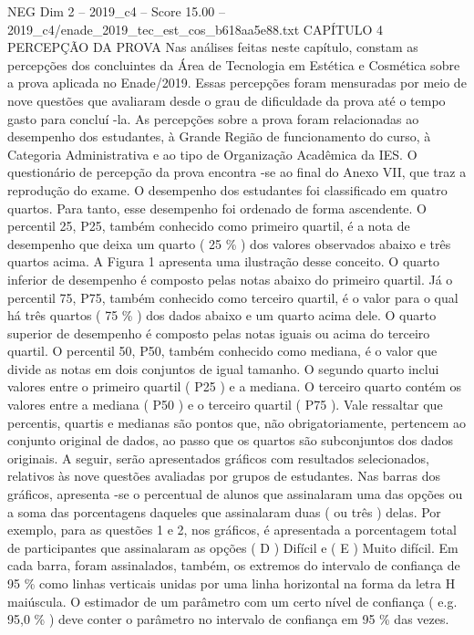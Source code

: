 \begin{textsample}{NEG Dim 2 – 2019\_c4 – Score 15.00 – 2019\_c4/enade\_2019\_tec\_est\_cos\_b618aa5e88.txt}  \label{ex:f2_neg_391}
CAPÍTULO 4 PERCEPÇÃO DA PROVA Nas análises feitas neste capítulo, constam as percepções dos concluintes da Área de Tecnologia em Estética e Cosmética sobre a prova aplicada no Enade/2019.
Essas percepções foram mensuradas por meio de nove questões que avaliaram desde o grau de dificuldade da prova até o tempo gasto para concluí -la.
As percepções sobre a prova foram relacionadas ao desempenho dos estudantes, à Grande Região de funcionamento do curso, à Categoria Administrativa e ao tipo de Organização Acadêmica da IES.
O questionário de percepção da prova encontra -se ao final do Anexo VII, que traz a reprodução do exame.
O desempenho dos estudantes foi classificado em quatro quartos.
Para tanto, esse desempenho foi ordenado de forma ascendente.
O percentil 25, P25, também conhecido como primeiro quartil, é a nota de desempenho que deixa um quarto ( 25 \% ) dos valores observados abaixo e três quartos acima.
A Figura 1 apresenta uma ilustração desse conceito.
O quarto inferior de desempenho é composto pelas notas abaixo do primeiro quartil.
Já o percentil 75, P75, também conhecido como terceiro quartil, é o valor para o qual há três quartos ( 75 \% ) dos dados abaixo e um quarto acima dele.
O quarto superior de desempenho é composto pelas notas iguais ou acima do terceiro quartil.
O percentil 50, P50, também conhecido como mediana, é o valor que divide as notas em dois conjuntos de igual tamanho.
O segundo quarto inclui valores entre o primeiro quartil ( P25 ) e a mediana.
O terceiro quarto contém os valores entre a mediana ( P50 ) e o terceiro quartil ( P75 ).
Vale ressaltar que percentis, quartis e medianas são pontos que, não obrigatoriamente, pertencem ao conjunto original de dados, ao passo que os quartos são subconjuntos dos dados originais.
A seguir, serão apresentados gráficos com resultados selecionados, relativos às nove questões avaliadas por grupos de estudantes.
Nas barras dos gráficos, apresenta -se o percentual de alunos que assinalaram uma das opções ou a soma das porcentagens daqueles que assinalaram duas ( ou três ) delas.
Por exemplo, para as questões 1 e 2, nos gráficos, é apresentada a porcentagem total de participantes que assinalaram as opções ( D ) Difícil e ( E ) Muito difícil.
Em cada barra, foram assinalados, também, os extremos do intervalo de confiança de 95 \% como linhas verticais unidas por uma linha horizontal na forma da letra H maiúscula.
O estimador de um parâmetro com um certo nível de confiança ( e.g. 95,0 \% ) deve conter o parâmetro no intervalo de confiança em 95 \% das vezes.

\end{textsample}
